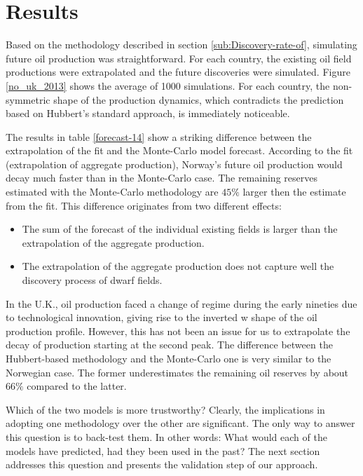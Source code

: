 \documentclass[review]{elsarticle}
\begin{document}
\section{Results\label{sec:Results}}

Based on the methodology described in section \ref{sub:Discovery-rate-of},
simulating future oil production was straightforward. For each country,
the existing oil field productions were extrapolated and the future discoveries were
simulated. Figure \ref{no_uk_2013} shows the average of 1000 simulations.
For each country, the non-symmetric shape of the production dynamics, which
contradicts the prediction based on Hubbert's standard approach,
is immediately noticeable.

The results in table \ref{forecast-14} show a striking difference
between the extrapolation of the fit and the Monte-Carlo model forecast. According to the
fit (extrapolation of aggregate production), Norway's future oil production
would decay much faster than in the Monte-Carlo case. The remaining
reserves estimated with the Monte-Carlo methodology are $45\%$ larger
then the estimate from the fit. This difference originates from two
different effects:
\begin{itemize}
\item The sum of the forecast of the individual existing fields is larger
than the extrapolation of the aggregate production.
\item The extrapolation of the aggregate production does not capture well
the discovery process of dwarf fields.
\end{itemize}
In the U.K., oil production faced a change of regime during the early
nineties due to technological innovation, giving rise to the inverted
\textquotedbl{}w shape\textquotedbl{} of the oil production profile.
However, this has not been an issue for us to extrapolate the decay of production
starting at the second peak. The difference between the Hubbert-based
methodology and the Monte-Carlo one is very similar to the Norwegian
case. The former underestimates the remaining oil reserves by about
$66\%$ compared to the latter.

Which of the two models is more trustworthy? Clearly, the implications
in adopting one methodology over the other are significant. The only
way to answer this question is to back-test them. In other words:
\textquotedbl{}What would each of the models have predicted, had they
been used in the past?\textquotedbl{} The next section addresses
this question and presents the validation step of our approach.
\end{document}
